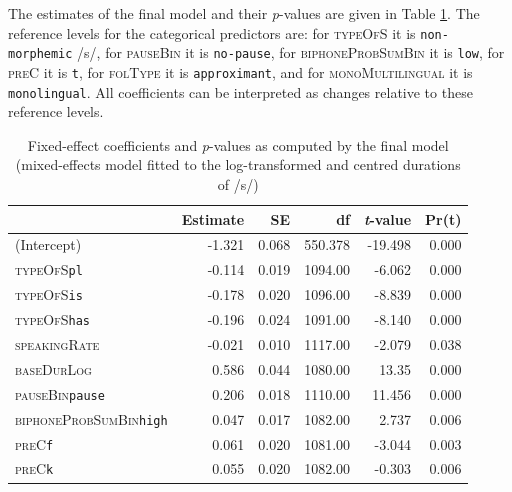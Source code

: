 The estimates of the final model and their \textit{p}-values are given in Table \ref{tab:4.5}. The reference levels for the categorical predictors are: for \textsc{typeOfS} it is \texttt{non-morphemic} /s/, for \textsc{pauseBin} it is \texttt{no-pause}, for \textsc{biphoneProbSumBin} it is \texttt{low}, for \textsc{preC} it is \texttt{t}, for \textsc{folType} it is \texttt{approximant}, and for \textsc{monoMultilingual} it is \texttt{monolingual}. All coefficients can be interpreted as changes relative to these reference levels.

\begin{table}\fontsize{10}{11}
\caption{Fixed-effect coefficients and \textit{p}-values as computed by the final model (mixed-effects model fitted to the log-transformed and centred durations of /s/)}
\label{tab:4.5}
\centering
\begin{tabular}{lrrrrr} 
\lsptoprule
~                            & Estimate & SE    & df      & \textit{t}-value & Pr(\textbar{}t\textbar{})  \\ 
\midrule
(Intercept)                  & -1.321   & 0.068 & 550.378 & -19.498          & 0.000                      \\
\textsc{typeOfS}\texttt{pl}                    & -0.114   & 0.019 & 1094.00 & -6.062           & 0.000                      \\
\textsc{typeOfS}\texttt{is}                    & -0.178   & 0.020 & 1096.00 & -8.839           & 0.000                      \\
\textsc{typeOfS}\texttt{has}                   & -0.196   & 0.024 & 1091.00 & -8.140           & 0.000                      \\
\textsc{speakingRate}                 & -0.021   & 0.010 & 1117.00 & -2.079           & 0.038                      \\
\textsc{baseDurLog}                   & 0.586    & 0.044 & 1080.00 & 13.35            & 0.000                      \\
\textsc{pauseBin}\texttt{pause}                & 0.206    & 0.018 & 1110.00 & 11.456           & 0.000                      \\
\textsc{biphoneProbSumBin}\texttt{high}        & 0.047    & 0.017 & 1082.00 & 2.737            & 0.006                      \\
\textsc{preC}\texttt{f}                        & 0.061    & 0.020 & 1081.00 & -3.044           & 0.003                      \\
\textsc{preC}\texttt{k}                        & 0.055    & 0.020 & 1082.00 & -0.303           & 0.006                      \\

\end{tabular}
\end{table}
